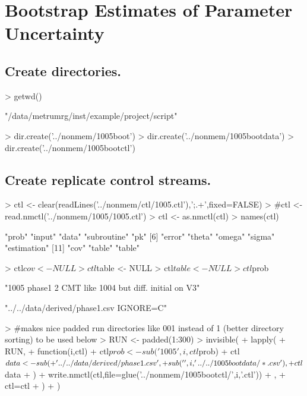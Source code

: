 \section{Bootstrap Estimates of Parameter Uncertainty}
\subsection{Create directories.}
\begin{Schunk}
\begin{Sinput}
> getwd()
\end{Sinput}
\begin{Soutput}
[1] "/data/metrumrg/inst/example/project/script"
\end{Soutput}
\begin{Sinput}
> dir.create('../nonmem/1005boot')
> dir.create('../nonmem/1005bootdata')
> dir.create('../nonmem/1005bootctl')
\end{Sinput}
\end{Schunk}
\subsection{Create replicate control streams.}
\begin{Schunk}
\begin{Sinput}
> ctl <- clear(readLines('../nonmem/ctl/1005.ctl'),';.+',fixed=FALSE)
> #ctl <- read.nmctl('../nonmem/1005/1005.ctl')
> ctl <- as.nmctl(ctl)
> names(ctl)
\end{Sinput}
\begin{Soutput}
 [1] "prob"       "input"      "data"       "subroutine" "pk"        
 [6] "error"      "theta"      "omega"      "sigma"      "estimation"
[11] "cov"        "table"      "table"     
\end{Soutput}
\begin{Sinput}
> ctl$cov <- NULL
> ctl$table <- NULL
> ctl$table <- NULL
> ctl$prob
\end{Sinput}
\begin{Soutput}
[1] "1005 phase1 2 CMT like 1004 but diff. initial on V3"
\end{Soutput}
\begin{Soutput}
[1] "../../data/derived/phase1.csv IGNORE=C"
\end{Soutput}
\begin{Sinput}
> #makes nice padded run directories like 001 instead of 1 (better directory sorting) to be used below
> RUN <- padded(1:300) 
> invisible(
+   lapply(
+     RUN,
+     function(i,ctl){
+       ctl$prob <- sub('1005',i,ctl$prob)
+       ctl$data <- sub(
+         '../../data/derived/phase1.csv',
+         sub('\\*',i,'../../1005bootdata/*.csv'),
+         ctl$data
+       )
+       write.nmctl(ctl,file=glue('../nonmem/1005bootctl/',i,'.ctl'))
+     },
+     ctl=ctl
+   )
+ )
\end{Sinput}
\end{Schunk}

